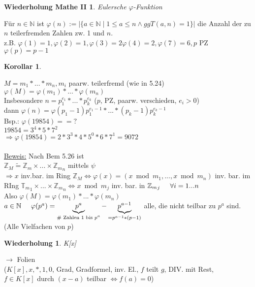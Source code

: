 \documentclass[a4paper,11pt]{article}
\newtheorem{koro}[definition]{Korollar}
\newtheorem{wdh}[definition]{Wiederholung Mathe II}
\newtheorem{wdhlg}[definition]{Wiederholung}
\newcommand{\hsp}{\hspace{5mm}}
\begin{document}
\begin{wdh}
	Eulersche $\varphi$-Funktion
\end{wdh}
Für $n\in\mathbb{N}$ ist $\varphi(n):=\vert\{a\in\mathbb{N}\mid1\leq a\leq n\land ggT(a,n)=1\}\vert$ die Anzahl der zu $n$ teilerfremden Zahlen zw. 1 und $n$. \\
z.B. $\varphi(1)=1,\varphi(2)=1,\varphi(3)=2\varphi(4)=2,\varphi(7)=6, p$ PZ $\varphi(p)=p-1$

\begin{koro}
\end{koro}
$M=m_1*...*m_n,m_i$ paarw. teilerfremd (wie in 5.24) \\
$\varphi(M)=\varphi(m_1)*...*\varphi(m_n)$ \\
Insbesondere $n=p_1^{e_1}*...*p_k^{e_k}$ ($p$, PZ, paarw. verschieden, $e_i>0$) \\
dann $\varphi(n)=\varphi(p_1-1)p_1^{e_1-1}*...*(p_k-1)p_k^{e_k-1}$ \\
Bsp.: $\varphi(19854)==?$ \\
$19854=3^4*5*7^2$ \\
$\Rightarrow\varphi(19854)=2*3^3*4*5^0*6*7^1=9072$ \\
\\
\underline{Beweis:} Nach Bem 5.26 ist \\
$\mathbb{Z}_M\widetilde{=}\mathbb{Z}_m\times...\times{\mathbb{Z}_m}_n$ mittels $\psi$ \\
$\Rightarrow x$ inv.bar. im Ring $\mathbb{Z}_M\Leftrightarrow\varphi(x)=(x\bmod m_1,...,x\bmod m_n)$ inv. bar. im RIng ${\mathbb{T}_m}_1\times...\times{\mathbb{Z}_m}_n\Leftrightarrow x\bmod m_j$ inv. bar. in ${\mathbb{Z}_m}_j\hsp\forall i=1...n$ \\
Also $\varphi(M)=\varphi(m_1)*...*\varphi(m_n)$ \\
$a\in\mathbb{N}\hsp\varphi(p^a)=\underbrace{p^a}_{\text{\# Zahlen 1 bis $p^a$}}-\underbrace{p^{a-1}}_{=p^{a-1}*(p-1)}$ alle, die nicht teilbar zu $p^a$ sind. \\
(Alle Vielfachen von $p$)

\begin{wdhlg}
	K[x]
\end{wdhlg}
$\rightarrow$ Folien \\
($K[x],x,*,1,0$, Grad, Gradformel, inv. El., $f$ teilt $g$, DIV. mit Rest, \\
$f\in K[x]$ durch $(x-a)$ teilbar $\Leftrightarrow f(a)=0$)

\newpage
\end{document}

